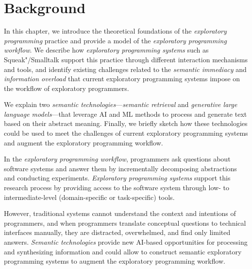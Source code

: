
\chapter{Background}
\label{cha:background}

In this chapter, we introduce the theoretical foundations of the \emph{exploratory programming} practice and provide a model of the \emph{exploratory programming workflow}.
We describe how \emph{exploratory programming systems} such as Squeak"/Smalltalk support this practice through different interaction mechanisms and tools, and identify existing challenges related to the \emph{semantic immediacy} and \emph{information overload} that current exploratory programming systems impose on the workflow of exploratory programmers.

We explain two \emph{semantic technologies}---\emph{semantic retrieval} and \emph{generative large language models}---that leverage AI and ML methods to process and generate text based on their abstract meaning.
Finally, we briefly sketch how these technologies could be used to meet the challenges of current exploratory programming systems and augment the exploratory programming workflow.


\begin{summary}
	In the \emph{exploratory programming workflow}, programmers ask questions about software systems and answer them by incrementally decomposing abstractions and conducting experiments.
	\emph{Exploratory programming systems} support this research process by providing access to the software system through low- to intermediate-level (domain-specific or task-specific) tools.

	However, traditional systems cannot understand the context and intentions of programmers, and when programmers translate conceptual questions to technical interfaces manually, they are distracted, overwhelmed, and find only limited answers.
	\emph{Semantic technologies} provide new AI-based opportunities for processing and synthesizing information and could allow to construct semantic exploratory programming systems to augment the exploratory programming workflow.
\end{summary}
